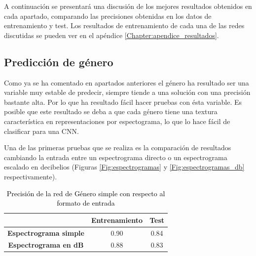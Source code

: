 A continuación se presentará una discusión de los mejores resultados obtenidos en cada apartado, comparando las precisiones obtenidas en los datos de entrenamiento y test. Los resultados de entrenamiento de cada una de las redes discutidas se pueden ver en el apéndice \ref{Chapter:apendice_resultados}.

\subsection{Predicción de género}\label{sec:resultados_genero}

\noindent Como ya se ha comentado en apartados anteriores el género ha resultado ser una variable muy estable de predecir, siempre tiende a una solución con una precisión bastante alta. Por lo que ha resultado fácil hacer pruebas con ésta variable. Es posible que este resultado se deba a que cada género tiene una textura característica en representaciones por espectograma, lo que lo hace fácil de clasificar para una CNN. 

Una de las primeras pruebas que se realiza es la comparación de resultados cambiando la entrada entre un espectrograma directo o un espectrograma escalado en decibelios (Figuras \ref{Fig:espectrogramas} y \ref{Fig:espectrogramas_db} respectivamente).

\begin{table}[h]
\centering
\begin{tabular}{ccc}
\textbf{}                     & \textbf{Entrenamiento} & \textbf{Test} \\ \hline
\textbf{Espectrograma simple} & 0.90                   & 0.84          \\
\textbf{Espectrograma en dB}  & 0.88                   & 0.83          \\ \hline
\end{tabular}
\caption{\textcolor{black}{Precisión de la red de Género simple con respecto al formato de entrada}}
\label{tab:precision_genero_inputs}
\end{table}

